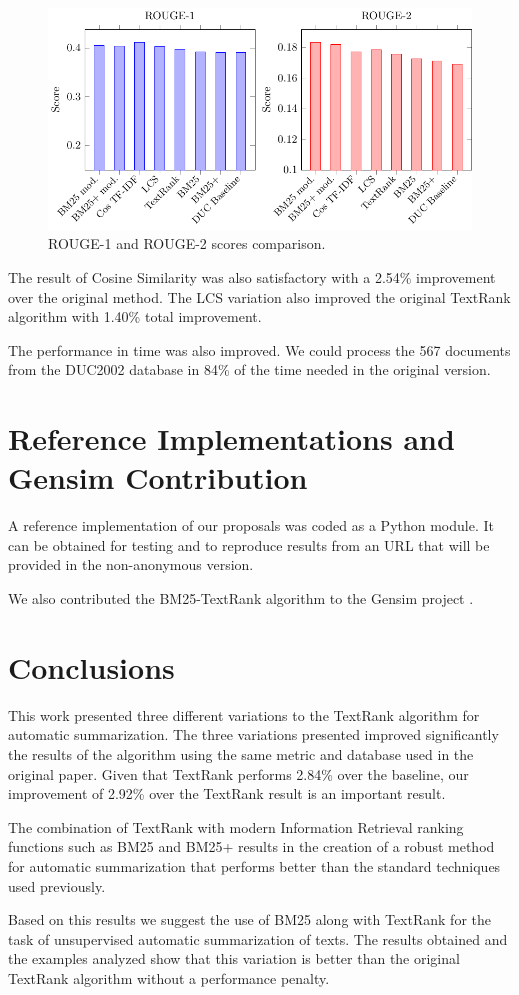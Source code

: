 \documentclass{llncs}
\begin{document}
\begin{figure}[h!]
    \centering
    \includegraphics[width=1\textwidth]{rouge-scores-en.pdf}
    \caption{ROUGE-1 and ROUGE-2 scores comparison.}
\end{figure}

The result of Cosine Similarity was also satisfactory with a 2.54\% improvement over the original method. The LCS variation also improved the original TextRank algorithm with 1.40\% total improvement.

The performance in time was also improved. We could process the 567 documents from the DUC2002 database in 84\% of the time needed in the original version.


\section{Reference Implementations and Gensim Contribution}
A reference implementation of our proposals was coded as a Python module. It can be obtained for testing and to reproduce results from an URL that will be provided in the non-anonymous version.

We also contributed the BM25-TextRank algorithm to the Gensim project \cite{rehurek_lrec}.

\section{Conclusions}
This work presented three different variations to the TextRank algorithm for automatic summarization. The three variations presented improved significantly the results of the algorithm using the same metric and database used in the original paper. Given that TextRank performs 2.84\% over the baseline, our improvement of 2.92\% over the TextRank result is an important result. 

The combination of TextRank with modern Information Retrieval ranking functions such as BM25 and BM25+ results in the creation of a robust method for automatic summarization that performs better than the standard techniques used previously. 

Based on this results we suggest the use of BM25 along with TextRank for the task of unsupervised automatic summarization of texts. The results obtained and the examples analyzed show that this variation is better than the original TextRank algorithm without a performance penalty.

{}

\end{document}
